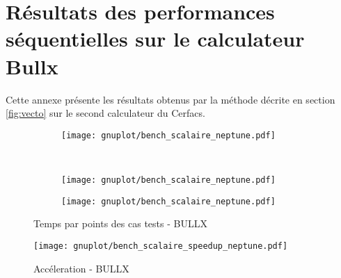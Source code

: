 \newpage
\section{Résultats des performances séquentielles sur le calculateur Bullx}\label{app:seq_neptune}

Cette annexe présente les résultats obtenus par la méthode décrite en section \ref{fig:vecto} sur le second calculateur du Cerfacs.

\begin{figure}[!ht]
  \centering
  \begin{subfigure}[b]{0.5\textwidth}
    \centering
    \texttt{[image: gnuplot/bench\_scalaire\_neptune.pdf]}
  \caption{\label{fig:bench_scal_neptune_nonper}}
  \end{subfigure}%
  ~
  \begin{subfigure}[b]{0.5\textwidth}
    \centering
    \texttt{[image: gnuplot/bench\_scalaire\_neptune.pdf]}
  \caption{\label{fig:bench_scal_neptune_sym}}
  \end{subfigure}
  \begin{subfigure}[b]{0.5\textwidth}
    \centering
    \texttt{[image: gnuplot/bench\_scalaire\_neptune.pdf]}
  \caption{\label{fig:bench_scal_neptune_per}}
  \end{subfigure}
  \caption{\label{fig:bench_scal_neptune}Temps par points des cas tests - BULLX}
\end{figure}


\begin{figure}[ht]
  \centering
  \texttt{[image: gnuplot/bench\_scalaire\_speedup\_neptune.pdf]}
  \caption{\label{fig:bench_scal_neptune_speedup} Accéleration - BULLX}
\end{figure}

%


